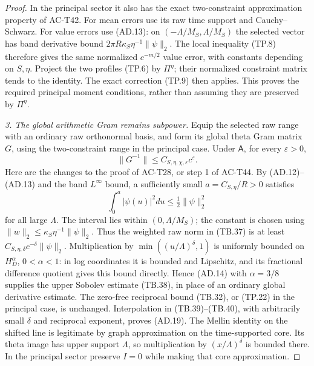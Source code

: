 \begin{proof}
In the principal sector it also has the exact
two-constraint approximation property of AC-T42.
For mean errors use its raw time support and
Cauchy--Schwarz.  For value errors use (AD.13):
on \((-\Lambda/M_S,\Lambda/M_S)\) the selected
vector has band derivative bound
\(2\pi R\kappa_S\eta^{-1}\|\psi\|_2\).
The local inequality (TP.8) therefore gives
the same normalized \(c^{-m/2}\) value error,
with constants depending on \(S,\eta\).
Project the two profiles (TP.6) by \(\Pi^\eta\);
their normalized constraint matrix tends to
the identity.  The exact correction (TP.9)
then applies.  This proves the required principal
moment conditions, rather than assuming they
are preserved by \(\Pi^\eta\).

\emph{3. The global arithmetic Gram remains subpower.}
Equip the selected raw range with an ordinary
raw orthonormal basis, and form its global
theta Gram matrix \(G\), using the two-constraint
range in the principal case.
Under \(\mathsf A\), for every \(\varepsilon>0\),
\[
                       \|G^{-1}\|\leq C_{S,\eta,\chi,\varepsilon}
                                                    c^\varepsilon .
 \tag{AD.19}
\]
Here are the changes to the proof of AC-T28,
or step 1 of AC-T44.
By (AD.12)--(AD.13) and the band \(L^\infty\)
bound, a sufficiently small
\(a=C_{S,\eta}/R>0\) satisfies
\[
       \int_0^a|\psi(u)|^2du\leq\tfrac12\|\psi\|_2^2
 \tag{AD.20}
\]
for all large \(\Lambda\).
The interval lies within \((0,\Lambda/M_S)\);
the constant is chosen using
\(\|w\|_2\leq\kappa_S\eta^{-1}\|\psi\|_2\).
Thus the weighted raw norm in (TB.37)
is at least \(C_{S,\eta,\delta}c^{-\delta}\|\psi\|_2\).
Multiplication by
\(\min((u/\Lambda)^\delta,1)\) is uniformly
bounded on \(H_D^\alpha\), \(0<\alpha<1\):
in log coordinates it is bounded and Lipschitz,
and its fractional difference quotient gives
this bound directly.  Hence (AD.14) with
\(\alpha=3/8\) supplies the upper Sobolev
estimate (TB.38), in place of an ordinary
global derivative estimate.
The zero-free reciprocal bound (TB.32), or
(TP.22) in the principal case, is unchanged.
Interpolation in (TB.39)--(TB.40), with
arbitrarily small \(\delta\) and reciprocal
exponent, proves (AD.19).
The Mellin identity on the shifted line is
legitimate by graph approximation on the
time-supported core.  Its theta image has
upper support \(\Lambda\), so multiplication
by \((x/\Lambda)^\delta\) is bounded there.
In the principal sector preserve \(I=0\)
while making that core approximation.


\end{proof}
